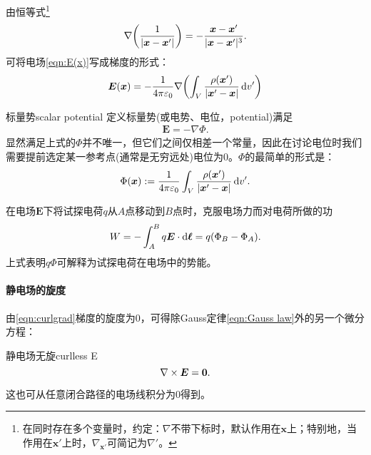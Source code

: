 由恒等式\footnote{在同时存在多个变量时，约定：$\nabla$不带下标时，默认作用在$\bm x$上；特别地，当作用在$\bm x'$上时，$\nabla_{\bm x'}$可简记为$\nabla'$。}
\[
    \nabla\biggl(\frac1{|\bm x-\bm x'|}\biggr)=-\frac{\bm x-\bm x'}{|\bm x-\bm x'|^3}.
\]
可将电场\eqref{eqn:E(x)}写成梯度的形式：
\[
    \bm E(\bm x)=-\frac1{4\pi\varepsilon_0}\nabla\biggl(\int_V\frac{\rho(\bm x')}{|\bm x'-\bm x|}\mathop{}\!\mathrm{d} v'\biggr)
\]
\begin{definition}{标量势}{scalar potential}
    定义标量势(或电势、电位，potential)满足
    \begin{align}
        \label{eqn:gradPhi}
        \bm E=-\nabla\Phi.
    \end{align}
    显然满足上式的$\Phi$并不唯一，但它们之间仅相差一个常量，因此在讨论电位时我们需要提前选定某一参考点(通常是无穷远处)电位为0。$\Phi$的最简单的形式是：
    \begin{align}
        \label{eqn:Phi-rho}
        \Phi(\bm x):=\frac1{4\pi\varepsilon_0}\int_V\frac{\rho(\bm x')}{|\bm x'-\bm x|}\mathop{}\!\mathrm{d} v'.
    \end{align}
\end{definition}

\begin{corollary}
    在电场$\bm E$下将试探电荷$q$从$A$点移动到$B$点时，克服电场力而对电荷所做的功
    \[
        W=-\int_A^Bq\bm E\cdot\mathop{}\!\mathrm{d}\bm\ell=q(\Phi_B-\Phi_A).
    \]
    上式表明$q\Phi$可解释为试探电荷在电场中的势能。
\end{corollary}

\paragraph{静电场的旋度}

由\eqref{eqn:curlgrad}梯度的旋度为0，可得除Gauss定律\eqref{eqn:Gauss law}外的另一个微分方程：
\begin{theorem}{静电场无旋}{curlless E}
    \begin{equation}
        \label{eqn:curlE}
        \nabla\times\bm E=\bm 0.
    \end{equation}
\end{theorem}
这也可从任意闭合路径的电场线积分为0得到。

